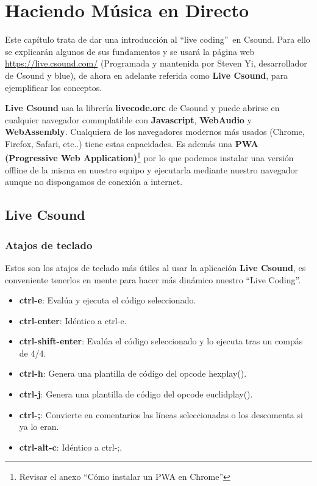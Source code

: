 
\chapter{Haciendo Música en Directo}

Este capítulo trata de dar una introducción al ``live coding''\ en Csound. Para ello se explicarán algunos de sus fundamentos y se usará la página web \url{https://live.csound.com/} (Programada y mantenida por Steven Yi, desarrollador de Csound y blue), de ahora en adelante referida como \textbf{Live Csound}, para ejemplificar los conceptos.

\textbf{Live Csound} usa la librería \textbf{livecode.orc} de Csound y puede abrirse en cualquier navegador commplatible con \textbf{Javascript}, \textbf{WebAudio} y \textbf{WebAssembly}. Cualquiera de los navegadores modernos más usados (Chrome, Firefox, Safari, etc..) tiene estas capacidades. Es además una \textbf{PWA (Progressive Web Application)}\footnote{Revisar el anexo ``Cómo instalar un PWA en Chrome''} por lo que podemos instalar una versión offline de la misma en nuestro equipo y ejecutarla mediante nuestro navegador aunque no dispongamos de conexión a internet.

\section{Live Csound}

\subsection{Atajos de teclado}

Estos son los atajos de teclado más útiles al usar la aplicación \textbf{Live Csound}, es conveniente tenerlos en mente para hacer más dinámico nuestro ``Live Coding''.

\begin{itemize}
 \item \textbf{ctrl-e}: Evalúa y ejecuta el código seleccionado.
 \item \textbf{ctrl-enter}:	Idéntico a ctrl-e.
 \item \textbf{ctrl-shift-enter}:  Evalúa el código seleccionado y lo ejecuta tras un compás de 4/4.
 \item \textbf{ctrl-h}:	Genera una plantilla de código del opcode hexplay().
 \item \textbf{ctrl-j}:	Genera una plantilla de código del opcode euclidplay().
 \item \textbf{ctrl-;}:	Convierte en comentarios las líneas seleccionadas o los descomenta si ya lo eran.
 \item \textbf{ctrl-alt-c}:	Idéntico a ctrl-;.
\end{itemize}

